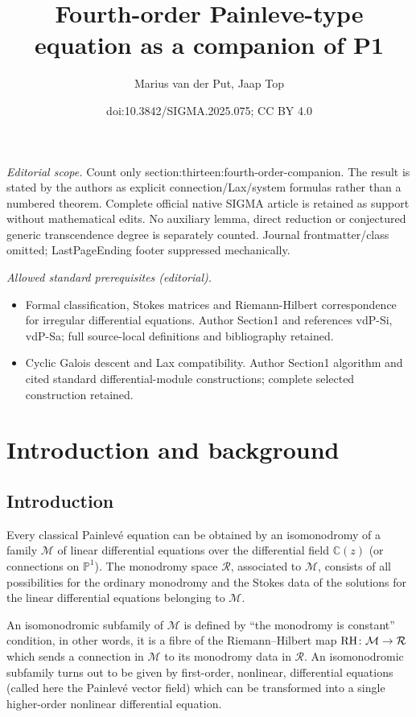 \documentclass[10pt,a4paper]{amsart}
\title{Fourth-order Painleve-type equation as a companion of P1}
\author{Marius van der Put, Jaap Top}
\date{doi:10.3842/SIGMA.2025.075; CC BY 4.0}
\numberwithin{equation}{section}
\begin{document}
\maketitle
\noindent\textit{Editorial scope.} Count only section:thirteen:fourth-order-companion. The result is stated by the authors as explicit connection/Lax/system formulas rather than a numbered theorem. Complete official native SIGMA article is retained as support without mathematical edits. No auxiliary lemma, direct reduction or conjectured generic transcendence degree is separately counted. Journal frontmatter/class omitted; LastPageEnding footer suppressed mechanically.\par\medskip
\noindent\textit{Allowed standard prerequisites (editorial).}\begin{itemize}
\item Formal classification, Stokes matrices and Riemann-Hilbert correspondence for irregular differential equations. Author Section1 and references vdP-Si, vdP-Sa; full source-local definitions and bibliography retained.
\item Cyclic Galois descent and Lax compatibility. Author Section1 algorithm and cited standard differential-module constructions; complete selected construction retained.
\end{itemize}\medskip
 \section{Introduction and background}\label{section0}

\subsection{Introduction}\label{FlNe}
Every classical Painlev\'e equation can be obtained by an isomonodromy of a family $\mathcal{M}$ of linear differential equations over the differential field $\mathbb{C}(z)$ \big(or connections on $\mathbb{P}^1$\big). The monodromy space $\mathcal{R}$, associated to $\mathcal{M}$, consists of all possibilities for the ordinary monodromy and the Stokes data of the solutions for the linear differential equations
belonging to $\mathcal{M}$.

An isomonodromic subfamily of $\mathcal{M}$ is defined by ``the monodromy is constant'' condition, in other words, it is
a fibre of the Riemann--Hilbert map ${\rm RH}\colon \mathcal{M}\rightarrow \mathcal{R}$ which sends a connection in $\mathcal{M}$
to its monodromy data in $\mathcal{R}$.
An isomonodromic subfamily turns out to be given by first-order, nonlinear, differential equations
(called here the Painlev\'e vector field) which can be transformed into a single higher-order nonlinear differential equation.
\end{document}
